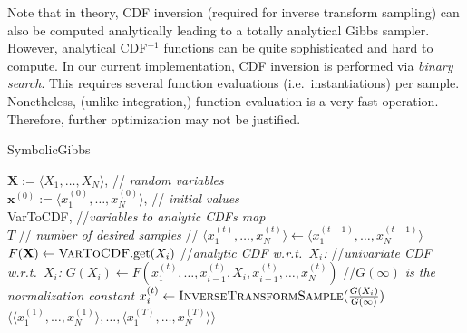 \documentclass[]{article}
\newcommand{\tuple}[1] {\langle #1 \rangle}
\newcommand{\bvec}[1]{\textbf{#1}}
\begin{document}
Note that in theory, CDF inversion (required for inverse transform sampling)
can also be computed analytically leading to a totally analytical Gibbs sampler.
However, analytical CDF$^{-1}$ functions can be quite sophisticated and hard to compute. 
In our current implementation, CDF inversion is performed via \emph{binary search}. This requires several function evaluations (i.e.\ instantiations) per sample. Nonetheless, (unlike integration,) function evaluation is a very fast operation. Therefore, further optimization may not be justified.    




\begin{algorithm}[hb!]%
\caption{{\sc SymbolicGibbs}  
\label{alg:symbolic-gibbs}}
\begin{algorithmic}
{$\bvec{X} := \tuple{X_1, \ldots, X_N}$, 				\hspace*{\fill}// \emph{\small random variables} \\
 $\bvec{x}^{(0)} := \tuple{x_1^{(0)}, \ldots, x_N^{(0)}}$, 	\hspace*{\fill}// \emph{\small initial values} \\
{\sc VarToCDF}, 								\hspace*{\fill}//\emph{\small variables to analytic CDFs map} \\
 $T$ 										\hspace*{\fill}// \emph{\small number of desired samples } }
//%
{\small
	 \STATE $\tuple{x_1^{(t)}, \ldots, x_N^{(t)}} \leftarrow \tuple{x_1^{(t-1)}, \ldots, x_N^{(t-1)}}$    
	\FOR{ {\bf each} $X_i \in \bvec{X}$}
		\STATE $F(\bvec{X}) \leftarrow \textsc{VarToCDF}.\text{get}(X_i)$ //\emph{analytic CDF w.r.t.\ $X_i$:}
		\STATE //\emph{univariate CDF w.r.t.\ $X_i$:}
		\STATE 	$G(X_i) \leftarrow F(x_1^{(t)}, \ldots, x_{i-1}^{(t)}, X_i, x_{i+1}^{(t)}, \ldots, x_N^{(t)})$ 
		\STATE //\emph{$G(\infty)$ is the normalization constant}
		\STATE $x_i^{(t)} \leftarrow \textsc{InverseTransformSample}(\frac{G(X_i)}{G(\infty)})$
	\ENDFOR %
\ENDFOR %
 {$\big\langle
			\tuple{x_1^{(1)}, \ldots, x_N^{(1)}}, \ldots, 
			\tuple{x_1^{(T)}, \ldots, x_N^{(T)}}
		\big\rangle$}\;
%	
} %
\end{algorithmic}
\end{algorithm}
\end{document}
